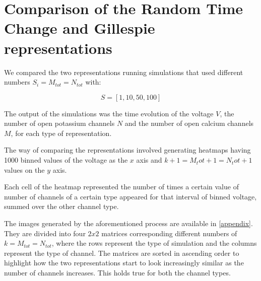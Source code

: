 \section{Comparison of the Random Time Change and Gillespie representations}
We compared the two representations running simulations that used different numbers $S_{i} = M_{tot} = N_{tot}$ with:

$$S = [1, 10, 50, 100]$$

The output of the simulations was the time evolution of the voltage $V$, the number of open potassium channels $N$ and the number of open calcium channels $M$, for each type of representation.

The way of comparing the representations involved generating heatmaps having 1000 binned values of the voltage as the $x$ axis and $k + 1 = M_tot + 1 = N_tot  + 1$ values on the $y$ axis.

Each cell of the heatmap represented the number of times a certain value of number of channels of a certain type appeared for that interval of binned voltage, summed over the other channel type.

The images generated by the aforementioned process are available in \ref{appendix}. They are divided into four $2x2$ matrices corresponding different numbers of $k = M_{tot} = N_{tot}$, where the rows represent the type of simulation and the columns represent the type of channel. The matrices are sorted in ascending order to highlight how the two representations start to look increasingly similar as the number of channels increases. This holds true for both the channel types.
